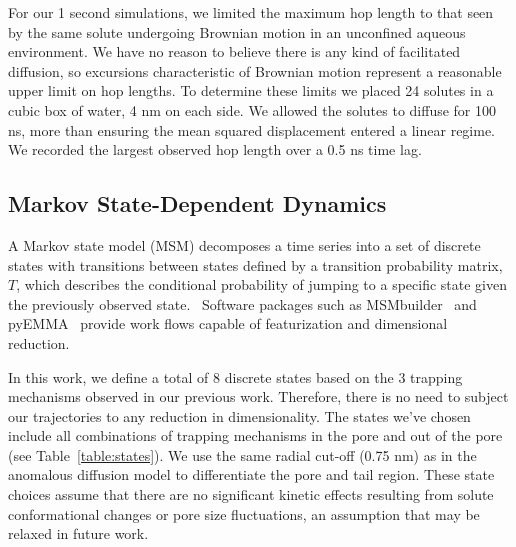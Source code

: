 \documentclass{article}
\begin{document}
  For our 1 second simulations, we limited the maximum hop length to that seen by
  the same solute undergoing Brownian motion in an unconfined aqueous environment. 
  We have no reason to believe there is any kind of facilitated diffusion, so 
  excursions characteristic of Brownian motion represent a reasonable upper limit
  on hop lengths. To determine these limits we placed 24 solutes in a cubic box of 
  water, 4 nm on each side. We allowed the solutes to diffuse for 100 ns, more than
  ensuring the mean squared displacement entered a linear regime. We recorded the largest
  observed hop length over a 0.5 ns time lag. 

  \subsection{Markov State-Dependent Dynamics}\label{method:MSMs}  

  A Markov state model (MSM) decomposes a time series into a set of discrete states
  with transitions between states defined by a transition probability matrix, $T$,
  which describes the conditional probability of jumping to a specific state given
  the previously observed state.~\cite{pande_everything_2010,wehmeyer_introduction_2018}
  Software packages such as MSMbuilder~\cite{beauchamp_msmbuilder2:_2011} and 
  pyEMMA~\cite{scherer_pyemma_2015} provide work flows capable of featurization and
  dimensional reduction.

  In this work, we define a total of 8 discrete states based on the 3 trapping
  mechanisms observed in our previous work. Therefore, there is no need to subject
  our trajectories to any reduction in dimensionality. 
  The states we've 
  chosen include all combinations of trapping mechanisms in the pore and out of
  the pore (see Table~\ref{table:states}). We use the same radial cut-off (0.75 nm)
  as in the anomalous diffusion model to differentiate the pore and tail region. 
  These state choices assume that there are no significant kinetic effects resulting
  from solute conformational changes or pore size fluctuations, an assumption that
  may be relaxed in future work.
  
\end{document}

